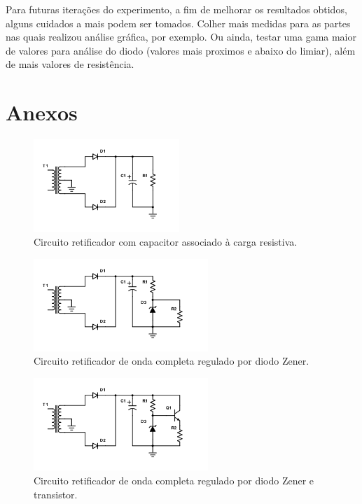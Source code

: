 \documentclass{article}
\begin{document}
Para futuras iterações do experimento, a fim de melhorar os resultados obtidos, alguns cuidados a mais podem ser tomados. Colher mais medidas para as partes nas quais realizou análise gráfica, por exemplo. Ou ainda, testar uma gama maior de valores para análise do diodo (valores mais proximos e abaixo do limiar), além de mais valores de resistência.

\nocite{*}



\newpage
\section*{Anexos}

\begin{figure}[h!]
    \centering
    \includegraphics[height=3.5cm]{imgSource/circ1.png}
    \caption{Circuito retificador com capacitor associado à carga resistiva.}
    \label{fig:circ1}
\end{figure}

\begin{figure}[h!]
    \centering
    \includegraphics[height=3.5cm]{imgSource/circ2.png}
    \caption{Circuito retificador de onda completa regulado por diodo Zener.}
    \label{fig:circ2}
\end{figure}

\begin{figure}[h!]
    \centering
    \includegraphics[height=3.5cm]{imgSource/circ3.png}
    \caption{Circuito retificador de onda completa regulado por diodo Zener e transistor.}
    \label{fig:circ3}
\end{figure}
\end{document}
